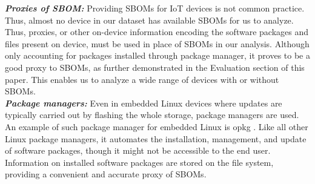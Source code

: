 \textbf{\textit{Proxies of SBOM:}} Providing SBOMs for IoT devices is not
common practice. Thus, almost no device in our dataset has available SBOMs for
us to analyze. Thus, proxies, or other on-device information encoding the
software packages and files present on device, must be used in place of SBOMs
in our analysis. Although only accounting for packages installed through
package manager, it proves to be a good proxy to SBOMs, as further demonstrated
in the Evaluation section of this paper. This enables us to analyze a wide
range of devices with or without SBOMs. \\ \textbf{\textit{Package managers:}}
Even in embedded Linux devices where updates are typically carried out by
flashing the whole storage, package managers are used. An example of such
package manager for embedded Linux is opkg \cite{opkg}. Like all other Linux
package managers, it automates the installation, management, and update of
software packages, though it might not be accessible to the end user.
Information on installed software packages are stored on the file system,
providing a convenient and accurate proxy of SBOMs.


